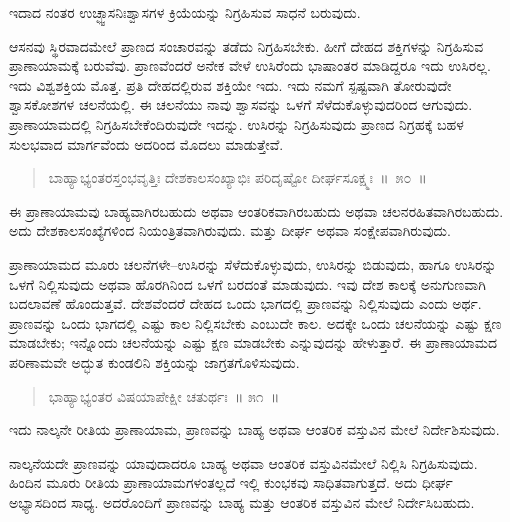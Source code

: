 \vspace{-0.3cm}

ಇದಾದ ನಂತರ ಉಚ್ಛ್ವಾಸನಿಃಶ್ವಾಸಗಳ ಕ್ರಿಯೆಯನ್ನು ನಿಗ್ರಹಿಸುವ ಸಾಧನೆ ಬರುವುದು. 

ಆಸನವು ಸ್ಥಿರವಾದಮೇಲೆ ಪ್ರಾಣದ ಸಂಚಾರವನ್ನು ತಡೆದು ನಿಗ್ರಹಿಸಬೇಕು. ಹೀಗೆ ದೇಹದ ಶಕ್ತಿಗಳನ್ನು ನಿಗ್ರಹಿಸುವ ಪ್ರಾಣಾಯಾಮಕ್ಕೆ ಬರುವೆವು. ಪ್ರಾಣವೆಂದರೆ ಅನೇಕ ವೇಳೆ ಉಸಿರೆಂದು ಭಾಷಾಂತರ ಮಾಡಿದ್ದರೂ ಇದು ಉಸಿರಲ್ಲ. ಇದು ವಿಶ್ವಶಕ್ತಿಯ ಮೊತ್ತ. ಪ್ರತಿ ದೇಹದಲ್ಲಿರುವ ಶಕ್ತಿಯೇ ಇದು. ಇದು ನಮಗೆ ಸ್ಪಷ್ಟವಾಗಿ ತೋರುವುದೇ ಶ್ವಾಸಕೋಶಗಳ ಚಲನೆಯಲ್ಲಿ. ಈ ಚಲನೆಯು ನಾವು ಶ್ವಾಸವನ್ನು ಒಳಗೆ ಸೆಳೆದುಕೊಳ್ಳುವುದರಿಂದ ಆಗುವುದು. ಪ್ರಾಣಾಯಾಮದಲ್ಲಿ ನಿಗ್ರಹಿಸಬೇಕೆಂದಿರುವುದೇ ಇದನ್ನು. ಉಸಿರನ್ನು ನಿಗ್ರಹಿಸುವುದು ಪ್ರಾಣದ ನಿಗ್ರಹಕ್ಕೆ ಬಹಳ ಸುಲಭವಾದ ಮಾರ್ಗವೆಂದು ಅದರಿಂದ ಮೊದಲು ಮಾಡುತ್ತೇವೆ. 

\vspace{-0.3cm}

\begin{verse}
ಬಾಹ್ಯಾಭ್ಯಂತರಸ್ತಂಭವೃತ್ತಿಃ ದೇಶಕಾಲಸಂಖ್ಯಾಭಿಃ ಪರಿದೃಷ್ಟೋ ದೀರ್ಘಸೂಕ್ಷ್ಮಃ~॥~೫೦~॥
\end{verse}

\vspace{-0.3cm}

ಈ ಪ್ರಾಣಾಯಾಮವು ಬಾಹ್ಯವಾಗಿರಬಹುದು ಅಥವಾ ಆಂತರಿಕವಾಗಿರಬಹುದು ಅಥವಾ ಚಲನರಹಿತವಾಗಿರಬಹುದು. ಅದು ದೇಶಕಾಲಸಂಖ್ಯೆಗಳಿಂದ ನಿಯಂತ್ರಿತವಾಗಿರುವುದು. ಮತ್ತು ದೀರ್ಘ ಅಥವಾ ಸಂಕ್ಷೇಪವಾಗಿರುವುದು. 

ಪ್ರಾಣಾಯಾಮದ ಮೂರು ಚಲನೆಗಳೇ–ಉಸಿರನ್ನು ಸೆಳೆದುಕೊಳ್ಳುವುದು, ಉಸಿರನ್ನು ಬಿಡುವುದು, ಹಾಗೂ ಉಸಿರನ್ನು ಒಳಗೆ ನಿಲ್ಲಿಸುವುದು ಅಥವಾ ಹೊರಗಿನಿಂದ ಒಳಗೆ ಬರದಂತೆ ಮಾಡುವುದು. ಇವು ದೇಶ ಕಾಲಕ್ಕೆ ಅನುಗುಣವಾಗಿ ಬದಲಾವಣೆ ಹೊಂದುತ್ತವೆ. ದೇಶವೆಂದರೆ ದೇಹದ ಒಂದು ಭಾಗದಲ್ಲಿ ಪ್ರಾಣವನ್ನು ನಿಲ್ಲಿಸುವುದು ಎಂದು ಅರ್ಥ. ಪ್ರಾಣವನ್ನು ಒಂದು ಭಾಗದಲ್ಲಿ ಎಷ್ಟು ಕಾಲ ನಿಲ್ಲಿಸಬೇಕು ಎಂಬುದೇ ಕಾಲ. ಅದಕ್ಕೇ ಒಂದು ಚಲನೆಯನ್ನು ಎಷ್ಟು ಕ್ಷಣ ಮಾಡಬೇಕು; ಇನ್ನೊಂದು ಚಲನೆಯನ್ನು ಎಷ್ಟು ಕ್ಷಣ ಮಾಡಬೇಕು ಎನ್ನುವುದನ್ನು ಹೇಳುತ್ತಾರೆ. ಈ ಪ್ರಾಣಾಯಾಮದ ಪರಿಣಾಮವೇ ಅದ್ಭುತ ಕುಂಡಲಿನಿ ಶಕ್ತಿಯನ್ನು ಜಾಗ್ರತಗೊಳಿಸುವುದು. 

\vspace{-0.3cm}

\begin{verse}
ಭಾಹ್ಯಾಭ್ಯಂತರ ವಿಷಯಾಪೇಕ್ಷೀ ಚತುರ್ಥಃ~॥ ೫೧~॥
\end{verse}

\vspace{-0.3cm}

ಇದು ನಾಲ್ಕನೇ ರೀತಿಯ ಪ್ರಾಣಾಯಾಮ, ಪ್ರಾಣವನ್ನು ಬಾಹ್ಯ ಅಥವಾ ಆಂತರಿಕ ವಸ್ತುವಿನ ಮೇಲೆ ನಿರ್ದೇಶಿಸುವುದು. 

ನಾಲ್ಕನೆಯದೇ ಪ್ರಾಣವನ್ನು ಯಾವುದಾದರೂ ಬಾಹ್ಯ ಅಥವಾ ಆಂತರಿಕ ವಸ್ತುವಿನಮೇಲೆ ನಿಲ್ಲಿಸಿ ನಿಗ್ರಹಿಸುವುದು. ಹಿಂದಿನ ಮೂರು ರೀತಿಯ ಪ್ರಾಣಾಯಾಮಗಳಂತಲ್ಲದೆ ಇಲ್ಲಿ ಕುಂಭಕವು ಸಾಧಿತವಾಗುತ್ತದೆ. ಅದು ಧೀರ್ಘ ಅಭ್ಯಾಸದಿಂದ ಸಾಧ್ಯ. ಅದರೊಂದಿಗೆ ಪ್ರಾಣವನ್ನು ಬಾಹ್ಯ ಮತ್ತು ಆಂತರಿಕ ವಸ್ತುವಿನ ಮೇಲೆ ನಿರ್ದೇಸಿಬಹುದು. 

